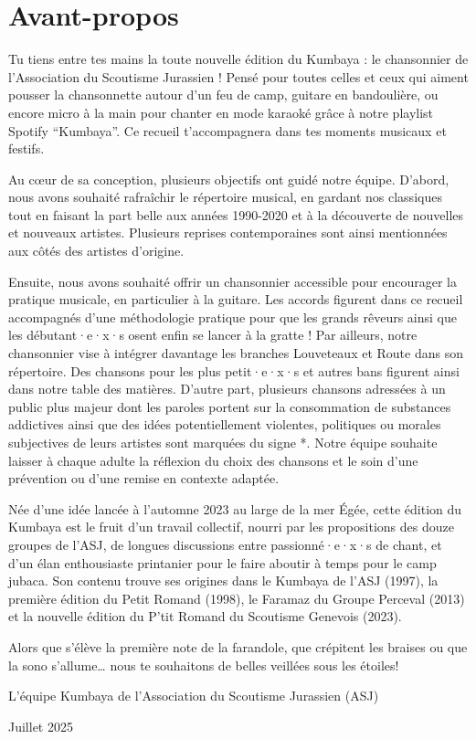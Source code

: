 \section*{Avant-propos}
\small Tu tiens entre tes mains la toute nouvelle édition du Kumbaya : le chansonnier de l'Association du Scoutisme Jurassien ! Pensé pour toutes celles et ceux qui aiment pousser la chansonnette autour d'un feu de camp, guitare en bandoulière, ou encore micro à la main pour chanter en mode karaoké grâce à notre playlist Spotify “Kumbaya”. Ce recueil t'accompagnera dans tes moments musicaux et festifs.

Au cœur de sa conception, plusieurs objectifs ont guidé notre équipe. D'abord, nous avons souhaité rafraîchir le répertoire musical, en gardant nos classiques tout en faisant la part belle aux années 1990-2020 et à la découverte de nouvelles et nouveaux artistes. Plusieurs reprises contemporaines sont ainsi mentionnées aux côtés des artistes d'origine.

Ensuite, nous avons souhaité offrir un chansonnier accessible pour encourager la pratique musicale, en particulier à la guitare. Les accords figurent dans ce recueil accompagnés d'une méthodologie pratique pour que les grands rêveurs ainsi que les débutant·e·x·s osent enfin se lancer à la gratte !
Par ailleurs, notre chansonnier vise à intégrer davantage les branches Louveteaux et Route dans son répertoire. Des chansons pour les plus petit·e·x·s et autres bans figurent ainsi dans notre table des matières. D'autre part, plusieurs chansons adressées à un public plus majeur dont les paroles portent sur la consommation de substances addictives ainsi que des idées potentiellement violentes, politiques ou morales subjectives de leurs artistes sont marquées du signe *. Notre équipe souhaite laisser à chaque adulte la réflexion du choix des chansons et le soin d'une prévention ou d'une remise en contexte adaptée.

Née d'une idée lancée à l'automne 2023 au large de la mer Égée, cette édition du Kumbaya est le fruit d'un travail collectif, nourri par les propositions des douze groupes de l'ASJ, de longues discussions entre passionné·e·x·s de chant, et d'un élan enthousiaste printanier pour le faire aboutir à temps pour le camp jubaca. Son contenu trouve ses origines dans le Kumbaya de l'ASJ (1997), la première édition du Petit Romand (1998), le Faramaz du Groupe Perceval (2013) et la nouvelle édition du P'tit Romand du Scoutisme Genevois (2023).

Alors que s'élève la première note de la farandole, que crépitent les braises ou que la sono s'allume… nous te souhaitons de belles veillées sous les étoiles!

L'équipe Kumbaya de l'Association du Scoutisme Jurassien (ASJ)

Juillet 2025
